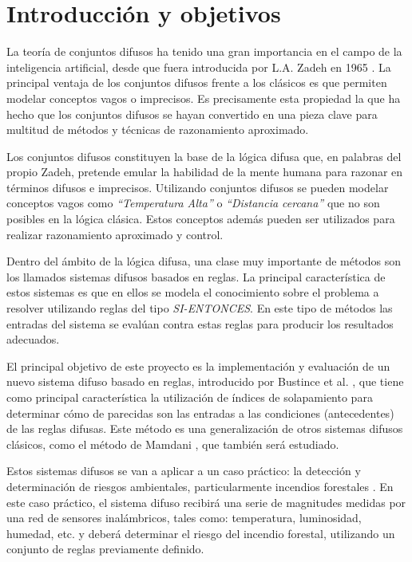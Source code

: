 \chapter{Introducción y objetivos}
La teoría de conjuntos difusos ha tenido una gran importancia en el campo de la inteligencia artificial, desde que fuera introducida por L.A. Zadeh en 1965 \cite{Zadeh65}. La principal ventaja de los conjuntos difusos frente a los clásicos es que permiten modelar conceptos vagos o imprecisos. Es precisamente esta propiedad la que ha hecho que los conjuntos difusos se hayan convertido en una pieza clave para multitud de métodos y técnicas de razonamiento aproximado.

Los conjuntos difusos constituyen la base de la lógica difusa que, en palabras del propio Zadeh, pretende emular la habilidad de la mente humana para razonar en términos difusos e imprecisos. Utilizando conjuntos difusos se pueden modelar conceptos vagos como \emph{``Temperatura Alta''} o \emph{``Distancia cercana''} que no son posibles en la lógica clásica. Estos conceptos además pueden ser utilizados para realizar razonamiento aproximado y control.

Dentro del ámbito de la lógica difusa, una clase muy importante de métodos son los llamados sistemas difusos basados en reglas. La principal característica de estos sistemas es que en ellos se modela el conocimiento sobre el problema a resolver utilizando reglas del tipo \emph{SI-ENTONCES}. En este tipo de métodos las entradas del sistema se evalúan contra estas reglas para producir los resultados adecuados.

El principal objetivo de este proyecto es la implementación y evaluación de un nuevo sistema difuso basado en reglas, introducido por Bustince et al. \cite{bustince2013overlap}, que tiene como principal característica la utilización de índices de solapamiento para determinar cómo de parecidas son las entradas a las condiciones (antecedentes) de las reglas difusas. Este método es una generalización de otros sistemas difusos clásicos, como el método de Mamdani \cite{Mamdani1975}, que también será estudiado.

Estos sistemas difusos se van a aplicar a un caso práctico: la detección y determinación de riesgos ambientales, particularmente incendios forestales \cite{bolourchi2013}. En este caso práctico, el sistema difuso recibirá una serie de magnitudes medidas por una red de sensores inalámbricos, tales como: temperatura, luminosidad, humedad, etc. y deberá determinar el riesgo del incendio forestal, utilizando un conjunto de reglas previamente definido.


